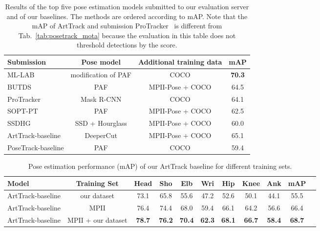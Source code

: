 \documentclass[10pt,twocolumn,letterpaper]{article}
\newcommand{\ProTracker}{ProTracker~\cite{ProTracker} \xspace}
\newcommand{\SOPTPT}{SOPT-PT~\cite{SOPT-PT}\xspace}
\newcommand{\MLLab}{ML-LAB~\cite{ML-LAB}\xspace}
\newcommand{\BUTDS}{BUTDS~\cite{BUDT}\xspace}
\newcommand{\SSDHG}{SSDHG\xspace}
\begin{document}
\begin{table}[tbp]
\centering
  \resizebox{\linewidth}{!} {\begin{tabular}{l c c c}
    \toprule
    Submission & Pose model & Additional training data & mAP  \\
\midrule

\MLLab & modification of PAF \cite{cao16arxiv} & COCO & \textbf{70.3} \\

\BUTDS & PAF \cite{cao16arxiv} & MPII-Pose + COCO & 64.5 \\ 

\ProTracker & Mask R-CNN \cite{he17iccv} & COCO & 64.1 \\

\SOPTPT & PAF \cite{cao16arxiv} & MPII-Pose + COCO & 62.5 \\



\SSDHG & SSD \cite{liu2016ssd} + Hourglass \cite{newell16eccv} & MPII-Pose + COCO & 60.0 \\


\midrule
ArtTrack-baseline & DeeperCut & MPII-Pose + COCO & 65.1 \\
PoseTrack-baseline & PAF \cite{cao16arxiv} & COCO & 59.4 \\
\bottomrule
  \end{tabular}
}
\caption[]{Results of the top five pose estimation models submitted to our evaluation
  server and of our baselines. The methods are ordered according to mAP. Note that the mAP of ArtTrack and submission \ProTracker is different from Tab.~\ref{tab:posetrack_mota} because the evaluation in this table does not threshold detections by the score.}
\label{tab:posetrack_map}
\end{table}
 \tabcolsep 2.5pt
\begin{table}[tbp]
\centering
  \resizebox{\linewidth}{!} {\begin{tabular}{@{} l c c ccc ccc c c@{}}
    \toprule
    Model& Training Set & Head   & Sho  & Elb & Wri & Hip & Knee & Ank & mAP \\
\midrule
     ArtTrack-baseline  & our dataset        & 73.1 & 65.8 & 55.6 & 47.2 & 52.6 & 50.1 & 44.1 & 55.5 \\
     ArtTrack-baseline & MPII               & 76.4 & 74.4 & 68.0 & 59.4 & 66.1 & 64.2 & 56.6 & 66.4 \\
     ArtTrack-baseline & MPII + our dataset & \textbf{78.7} & \textbf{76.2} & \textbf{70.4} & \textbf{62.3} & \textbf{68.1} & \textbf{66.7} & \textbf{58.4} & \textbf{68.7} \\
\bottomrule
  \end{tabular}
}
\caption[]{Pose estimation performance (mAP) of our ArtTrack baseline for
  different training sets.
}
\label{tab:per-frame-ap-val}
\end{table}
\end{document}
